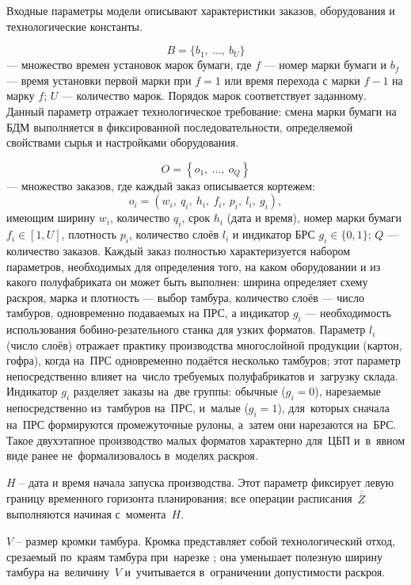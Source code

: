 Входные параметры модели описывают характеристики заказов, оборудования и технологические константы.

\[
B = \{ b_{1},\ \ldots,\ b_{U}\}
\]
--- множество времен установок марок бумаги, где $f$ --- номер марки бумаги и $b_{f}$ --- время установки первой марки при $f = 1$ или время перехода с марки $f - 1$ на марку $f$; $U$ --- количество марок.
Порядок марок соответствует заданному.
Данный параметр отражает технологическое требование: смена марки бумаги на БДМ выполняется в фиксированной последовательности, определяемой свойствами сырья и настройками оборудования.

\[
O = \left\{ o_{1},\ \ldots,\ o_{Q} \right\}
\]
--- множество заказов, где каждый заказ описывается кортежем:
\[
o_{i} = \left( w_{i},\ q_{i},\ h_{i},\ f_{i},\ p_{i},\ l_{i},\ g_{i} \right),
\]
имеющим ширину $w_{i}$, количество $q_{i}$, срок $h_{i}$ (дата и время), номер марки бумаги $f_{i} \in [1,U]$, плотность $p_{i}$, количество слоёв $l_{i}$ и индикатор БРС $g_{i} \in \{ 0,1\}$; $Q$ --- количество заказов.
Каждый заказ полностью характеризуется набором параметров, необходимых для определения того, на каком оборудовании и из какого полуфабриката он может быть выполнен: ширина определяет схему раскроя, марка и плотность --- выбор тамбура, количество слоёв --- число тамбуров, одновременно подаваемых на ПРС, а индикатор $g_i$ --- необходимость использования бобино-резательного станка для узких форматов.
Параметр $l_i$ (число слоёв) отражает практику производства многослойной продукции (картон, гофра), когда на~ПРС одновременно подаётся несколько тамбуров; этот параметр непосредственно влияет на~число требуемых полуфабрикатов и~загрузку склада.
Индикатор $g_i$ разделяет заказы на~две группы: обычные ($g_i=0$), нарезаемые непосредственно из~тамбуров на~ПРС, и~малые ($g_i=1$), для~которых сначала на~ПРС формируются промежуточные рулоны, а~затем они нарезаются на~БРС.
Такое двухэтапное производство малых форматов характерно для~ЦБП \cite{sgp_ccp2021_cutting_stock_modes} и~в~явном виде ранее не~формализовалось в~моделях раскроя.

$H$ -- дата и время начала запуска производства.
Этот параметр фиксирует левую границу временного горизонта планирования; все операции расписания~$\overline{\overline{Z}}$ выполняются начиная с~момента~$H$.

$V$ -- размер кромки тамбура.
Кромка представляет собой технологический отход, срезаемый по~краям тамбура при~нарезке \cite{hinxman1980trimloss}; она уменьшает полезную ширину тамбура на~величину~$V$ и~учитывается в~ограничении допустимости раскроя.

